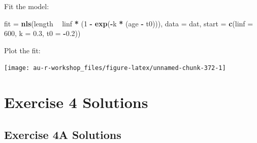 \documentclass[]{book}
\newenvironment{Shaded}{\begin{snugshade}}{\end{snugshade}}
\newcommand{\KeywordTok}[1]{\textcolor[rgb]{0.13,0.29,0.53}{\textbf{#1}}}
\newcommand{\DataTypeTok}[1]{\textcolor[rgb]{0.13,0.29,0.53}{#1}}
\newcommand{\DecValTok}[1]{\textcolor[rgb]{0.00,0.00,0.81}{#1}}
\newcommand{\FloatTok}[1]{\textcolor[rgb]{0.00,0.00,0.81}{#1}}
\newcommand{\StringTok}[1]{\textcolor[rgb]{0.31,0.60,0.02}{#1}}
\newcommand{\OperatorTok}[1]{\textcolor[rgb]{0.81,0.36,0.00}{\textbf{#1}}}
\newcommand{\NormalTok}[1]{#1}
\theoremstyle{definition}
\theoremstyle{definition}
\theoremstyle{definition}
\theoremstyle{remark}
\begin{document}
Fit the model:

\begin{Shaded}
\begin{Highlighting}[]
\NormalTok{fit =}\StringTok{ }\KeywordTok{nls}\NormalTok{(length }\OperatorTok{~}\StringTok{ }\NormalTok{linf }\OperatorTok{*}\StringTok{ }\NormalTok{(}\DecValTok{1} \OperatorTok{-}\StringTok{ }\KeywordTok{exp}\NormalTok{(}\OperatorTok{-}\NormalTok{k }\OperatorTok{*}\StringTok{ }\NormalTok{(age }\OperatorTok{-}\StringTok{ }\NormalTok{t0))),}
          \DataTypeTok{data =}\NormalTok{ dat, }\DataTypeTok{start =} \KeywordTok{c}\NormalTok{(}\DataTypeTok{linf =} \DecValTok{600}\NormalTok{, }\DataTypeTok{k =} \FloatTok{0.3}\NormalTok{, }\DataTypeTok{t0 =} \OperatorTok{-}\FloatTok{0.2}\NormalTok{))}
\end{Highlighting}
\end{Shaded}

Plot the fit:

\begin{Shaded}
\end{Shaded}

\begin{center}\texttt{[image: au-r-workshop\_files/figure-latex/unnamed-chunk-372-1]} \end{center}

\section*{Exercise 4 Solutions}\label{ex4-answers}

\hypertarget{ex4a-answers}{\subsection*{Exercise 4A
Solutions}\label{ex4a-answers}}
\end{document}
